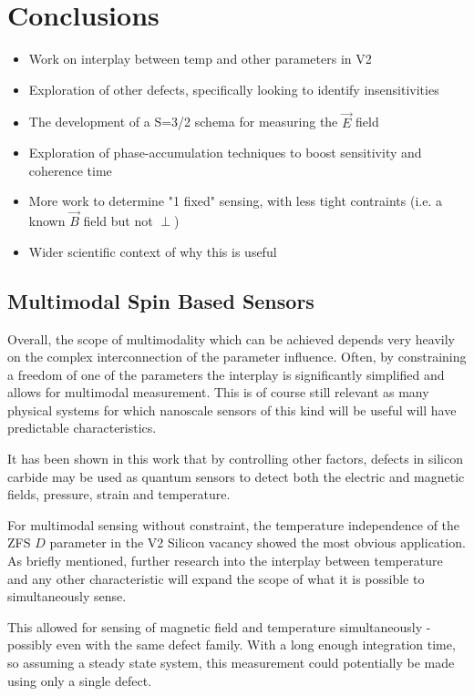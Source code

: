 \chapter{Conclusions}\label{ch:conclusions}
    \begin{itemize}
        \item Work on interplay between temp and other parameters in V2
        \item Exploration of other defects, specifically looking to identify insensitivities 
        \item The development of a S=3/2 schema for measuring the $\vec{E}$ field 
        \item Exploration of phase-accumulation techniques to boost sensitivity and coherence time
        \item More work to determine "1 fixed" sensing, with less tight contraints (i.e. a known $\vec{B}$ field but not $\perp$)
        \item Wider scientific context of why this is useful
    \end{itemize}
\section{Multimodal Spin Based Sensors}

Overall, the scope of multimodality which can be achieved depends very heavily on the complex interconnection of the parameter influence. Often, by constraining a freedom of one of the parameters the interplay is significantly simplified and allows for multimodal measurement. This is of course still relevant as many physical systems for which nanoscale sensors of this kind will be useful will have predictable characteristics. 

It has been shown in this work that by controlling other factors, defects in silicon carbide may be used as quantum sensors to detect both the electric and magnetic fields, pressure, strain and temperature. 

For multimodal sensing without constraint, the temperature independence of the ZFS $D$ parameter in the V2 Silicon vacancy showed the most obvious application. As briefly mentioned, further research into the interplay between temperature and any other characteristic will expand the scope of what it is possible to simultaneously sense. 

This allowed for sensing of magnetic field and temperature simultaneously - possibly even with the same defect family. With a long enough integration time, so assuming a steady state system, this measurement could potentially be made using only a single defect.

